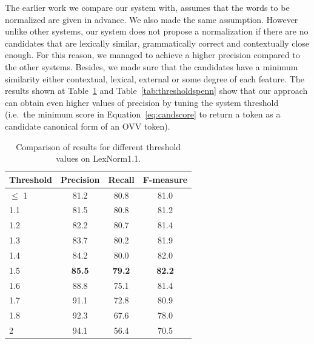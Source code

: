 \documentclass[a4paper,onesided,12pt]{report}
\begin{document}
The earlier work we compare our system with, assumes that the words to be normalized are given in advance. We also made the same assumption. However unlike other systems\cite{DBLP:conf/emnlp/YangE13,liu2012broad,Han:2011:LNS:2002472.2002520}, our system does not propose a normalization if there are no candidates that are lexically similar, grammatically correct and contextually close enough. For this reason, we managed to achieve a higher precision compared to the other systems. Besides, we made sure that the candidates have a minimum similarity either contextual, lexical, external or some degree of each feature. The results shown at Table~\ref{tab:thresholds} and Table~\ref{tab:thresholdspenn} show that our approach can obtain even higher values of precision by tuning the system threshold (i.e.~the minimum score in Equation~\ref{eq:candscore} to return a token as a candidate canonical form of an OVV token).
\\
\begin{table}[thb]
  \caption{Comparison of results for different threshold values on LexNorm1.1.}
  \centering
  \begin{tabular}[th]{|l|c|c|c|}
    \hline
    \textbf{Threshold} & \textbf{Precision} & \textbf{Recall} & \textbf{F-measure} \\
    \hline
    $\leq$ 1 & 81.2 &	80.8 &	81.0 \\\hline
    1.1 & 81.5 & 80.8 &	81.2 \\\hline
    1.2 & 82.2 &	80.7 &	81.4 \\\hline
    1.3 & 83.7 &	80.2 &	81.9 \\\hline
    1.4 & 84.2 &	80.0 &	82.0 \\\hline
    1.5 & \textbf{85.5} &  \textbf{79.2} &  \textbf{82.2} \\\hline
    1.6 & 88.8	& 75.1	& 81.4 \\\hline
    1.7	& 91.1	& 72.8	& 80.9 \\\hline
    1.8	& 92.3	& 67.6	& 78.0 \\\hline
    2	& 94.1	& 56.4	& 70.5 \\
    \hline
  \end{tabular}
\label{tab:thresholds}
\end{table}
\end{document}
